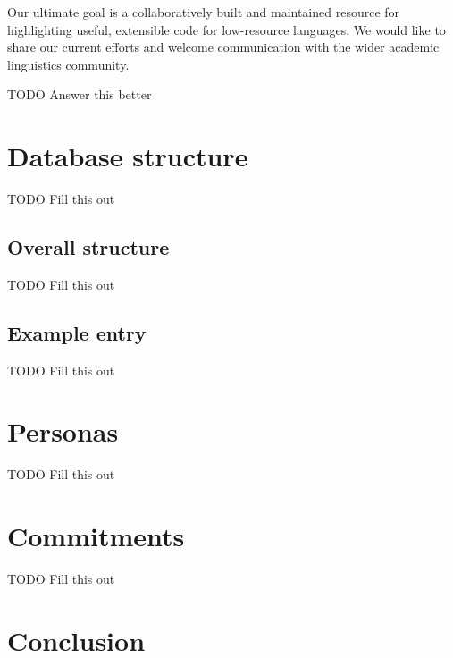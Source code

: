 \documentclass[10pt, a4paper]{article}
\begin{document}
Our ultimate goal is a collaboratively built and maintained resource for highlighting
useful, extensible code for low-resource languages. We would like to share our current efforts
and welcome communication with the wider academic linguistics community.

TODO Answer this better

\section{Database structure}
TODO Fill this out

\subsection{Overall structure}
TODO Fill this out

\subsection{Example entry}
TODO Fill this out

\section{Personas}
TODO Fill this out

\section{Commitments}

TODO Fill this out

\section{Conclusion}
\end{document}
